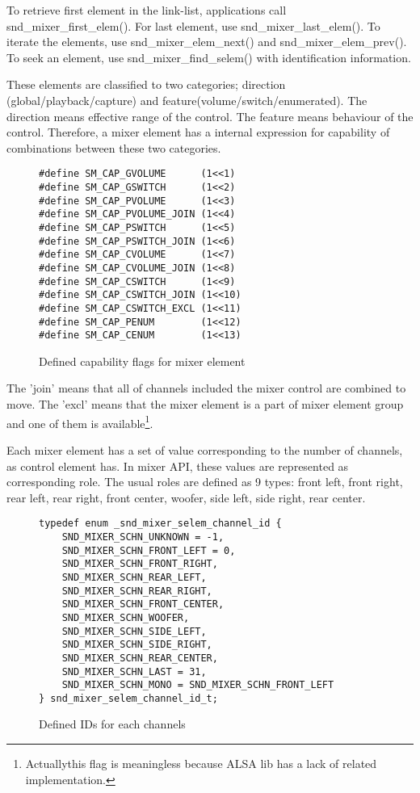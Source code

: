 \documentclass[onecolumn]{article}
\begin{document}
To retrieve first element in the link-list, applications call snd\_mixer\_first\_elem(). For last element, use snd\_mixer\_last\_elem(). To iterate the elements, use snd\_mixer\_elem\_next() and snd\_mixer\_elem\_prev(). To seek an element, use snd\_mixer\_find\_selem() with identification information.

These elements are classified to two categories; direction (global/playback/capture) and feature(volume/switch/enumerated). The direction means effective range of the control. The feature means behaviour of the control. Therefore, a mixer element has a internal expression for capability of combinations between these two categories.

\begin{figure}[htbp]
\small
\begin{verbatim}
#define SM_CAP_GVOLUME		(1<<1)
#define SM_CAP_GSWITCH		(1<<2)
#define SM_CAP_PVOLUME		(1<<3)
#define SM_CAP_PVOLUME_JOIN	(1<<4)
#define SM_CAP_PSWITCH		(1<<5)
#define SM_CAP_PSWITCH_JOIN	(1<<6)
#define SM_CAP_CVOLUME		(1<<7)
#define SM_CAP_CVOLUME_JOIN	(1<<8)
#define SM_CAP_CSWITCH		(1<<9)
#define SM_CAP_CSWITCH_JOIN	(1<<10)
#define SM_CAP_CSWITCH_EXCL	(1<<11)
#define SM_CAP_PENUM		(1<<12)
#define SM_CAP_CENUM		(1<<13)
\end{verbatim}
\caption{{Defined capability flags for mixer element}}
\label{fig:mixer-element-capability}
\end{figure}

The 'join' means that all of channels included the mixer control are combined to move. The 'excl' means that the mixer element is a part of mixer element group and one of them is available\footnote{Actuallythis flag is meaningless because ALSA lib has a lack of related implementation.}.

Each mixer element has a set of value corresponding to the number of channels, as control element has. In mixer API, these values are represented as corresponding role. The usual roles are defined as 9 types: front left, front right, rear left, rear right, front center, woofer, side left, side right, rear center.

\begin{figure}[htbp]
\small
\begin{verbatim}
typedef enum _snd_mixer_selem_channel_id {
	SND_MIXER_SCHN_UNKNOWN = -1,
	SND_MIXER_SCHN_FRONT_LEFT = 0,
	SND_MIXER_SCHN_FRONT_RIGHT,
	SND_MIXER_SCHN_REAR_LEFT,
	SND_MIXER_SCHN_REAR_RIGHT,
	SND_MIXER_SCHN_FRONT_CENTER,
	SND_MIXER_SCHN_WOOFER,
	SND_MIXER_SCHN_SIDE_LEFT,
	SND_MIXER_SCHN_SIDE_RIGHT,
	SND_MIXER_SCHN_REAR_CENTER,
	SND_MIXER_SCHN_LAST = 31,
	SND_MIXER_SCHN_MONO = SND_MIXER_SCHN_FRONT_LEFT
} snd_mixer_selem_channel_id_t;
\end{verbatim}
\caption{{Defined IDs for each channels}}
\label{fig:mixer-selem-channel-id}
\end{figure}
\end{document}
